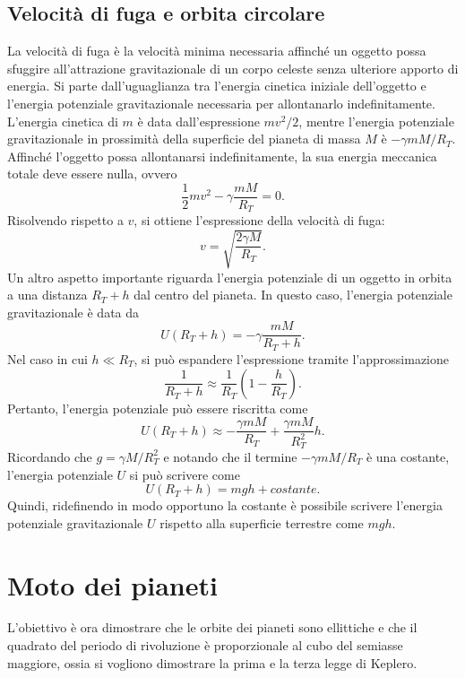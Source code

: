 \subsection{Velocità di fuga e orbita circolare}
La velocità di fuga è la velocità minima necessaria affinché un oggetto possa sfuggire all'attrazione gravitazionale di un corpo celeste senza ulteriore apporto di energia. Si parte dall'uguaglianza tra l'energia cinetica iniziale dell'oggetto e l'energia potenziale gravitazionale necessaria per allontanarlo indefinitamente. L'energia cinetica di $m$ è data dall'espressione $mv^2/2$, mentre l'energia potenziale gravitazionale in prossimità della superficie del pianeta di massa $M$ è $-\gamma m M/R_T$. Affinché l'oggetto possa allontanarsi indefinitamente, la sua energia meccanica totale deve essere nulla, ovvero
\begin{equation}
    \frac{1}{2}mv^2-\gamma\frac{mM}{R_T} = 0.
\end{equation}
Risolvendo rispetto a $v$, si ottiene l'espressione della velocità di fuga:
\begin{equation}
    v = \sqrt{\frac{2 \gamma M}{R_T}}.
\end{equation}
Un altro aspetto importante riguarda l'energia potenziale di un oggetto in orbita a una distanza $R_T+h$ dal centro del pianeta. In questo caso, l'energia potenziale gravitazionale è data da
\begin{equation}
    U(R_T + h) = -\gamma\frac{mM}{R_T + h}.
\end{equation}
Nel caso in cui $h\ll R_T$, si può espandere l'espressione tramite l'approssimazione
\begin{equation}
    \frac{1}{R_T + h} \approx \frac{1}{R_T} \left( 1 - \frac{h}{R_T} \right).
\end{equation}
Pertanto, l'energia potenziale può essere riscritta come
\begin{equation}
    U(R_T + h) \approx -\frac{\gamma m M}{R_T} + \frac{\gamma m M}{R_T^2} h.
\end{equation}
Ricordando che $g=\gamma M/R_T^2$ e notando che il termine $-\gamma m M/R_T$ è una costante, l'energia potenziale $U$ si può scrivere come
\begin{equation}
    U(R_T+h)=mgh+costante.
\end{equation}
Quindi, ridefinendo in modo opportuno la costante è possibile scrivere l'energia potenziale gravitazionale $U$ rispetto alla superficie terrestre come $mgh$. 

\section{Moto dei pianeti}
L'obiettivo è ora dimostrare che le orbite dei pianeti sono ellittiche e che il quadrato del periodo di rivoluzione è proporzionale al cubo del semiasse maggiore, ossia si vogliono dimostrare la prima e la terza legge di Keplero. 

